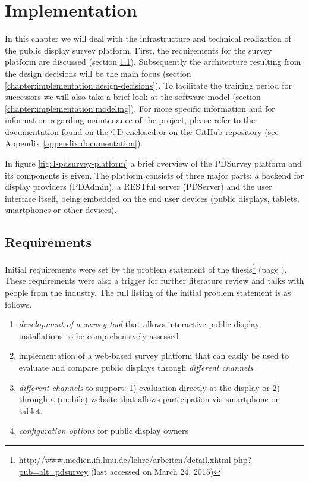 \section{Implementation}
\label{chapter:implementation}

	In this chapter we will deal with the infrastructure and technical realization of the public display survey platform. First, the requirements for the survey platform are discussed (section \ref{chapter:implementation:requirements}). Subsequently the architecture resulting from the design decisions will be the main focus (section \ref{chapter:implementation:design-decisions}). To facilitate the training period for successors we will also take a brief look at the software model (section \ref{chapter:implementation:modeling}). For more specific information and for information regarding maintenance of the project, please refer to the documentation found on the CD enclosed or on the GitHub repository (see Appendix \ref{appendix:documentation}).

	In figure \ref{fig:4-pdsurvey-platform} a brief overview of the PDSurvey platform and its components is given. The platform consists of three major parts: a backend for display providers (PDAdmin), a RESTful server (PDServer) and the user interface itself, being embedded on the end user devices (public displays, tablets, smartphones or other devices). 





\subsection{Requirements}
\label{chapter:implementation:requirements}

	Initial requirements were set by the problem statement of the thesis\footnote{\url{http://www.medien.ifi.lmu.de/lehre/arbeiten/detail.xhtml-php?pub=alt_pdsurvey} (last accessed on March 24, 2015)} (page \pageref{aufgabenstellung}). These requirements were also a trigger for further literature review and talks with people from the industry. The full listing of the initial problem statement is as follows.

	\begin{enumerate}[itemsep=0pt] 
	\item \textit{development of a survey tool} that allows interactive public display installations to be comprehensively assessed 
	\item implementation of a web-based survey platform that can easily be used to evaluate and compare public displays through \textit{different channels} 
	\item \textit{different channels} to support: 1) evaluation directly at
	the display or 2) through a (mobile) website that allows participation via smartphone or tablet.
	\item \textit{configuration options} for public display owners
	\end{enumerate}

